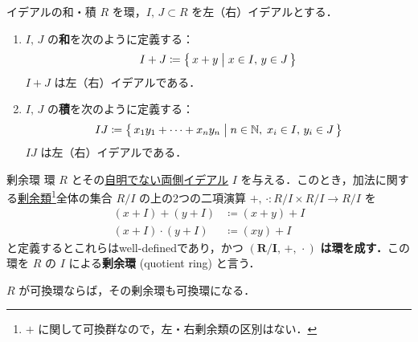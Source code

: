 \documentclass[geometry_main]{subfiles}
\begin{document}
\begin{mydef}[label=def:subtract-prod-ideal]{イデアルの和・積}
	$R$ を環，$I,\, J \subset R$ を左（右）イデアルとする．
	\begin{enumerate}
		\item $I,\, J$ の\textbf{和}を次のように定義する：
		\begin{align}
			I + J \coloneqq \bigl\{\, x+y \bigm| x\in I,\, y \in J \,\bigr\} 
		\end{align}
		$I+J$ は左（右）イデアルである．
		\item $I,\, J$ の\textbf{積}を次のように定義する：
		\begin{align}
			IJ \coloneqq \bigl\{\, x_1y_1 + \cdots + x_ny_n \bigm| n \in \mathbb{N},\; x_i\in I,\, y_i \in J \,\bigr\} 
		\end{align}
		$IJ$ は左（右）イデアルである．
	\end{enumerate}
\end{mydef}

\begin{mytheo}[label=def:quotient-ring]{剰余環}
	環 $R$ とその\underline{自明でない\hyperref[def:ideal]{両側イデアル}} $I$ を与える．このとき，加法に関する\hyperref[def.class_residue]{剰余類}\footnote{$+$ に関して可換群なので，左・右剰余類の区別はない．}全体の集合 $R/I$ の上の2つの二項演算 $+,\, \cdot \colon R/I \times R/I \to R/I$ を
	\begin{align}
		(x+I) + (y+I) &\coloneqq (x+y) + I \\
		(x+I) \cdot (y+I) &\coloneqq (xy) + I
	\end{align}
	と定義するとこれらはwell-definedであり，かつ $\bm{(R/I,\, +,\, \cdot\mathrel{})}$ \textbf{は環を成す．}この環を $R$ の $I$ による\textbf{剰余環} (quotient ring) と言う．
\end{mytheo}

\begin{marker}
	$R$ が可換環ならば，その剰余環も可換環になる．
\end{marker}
\end{document}
